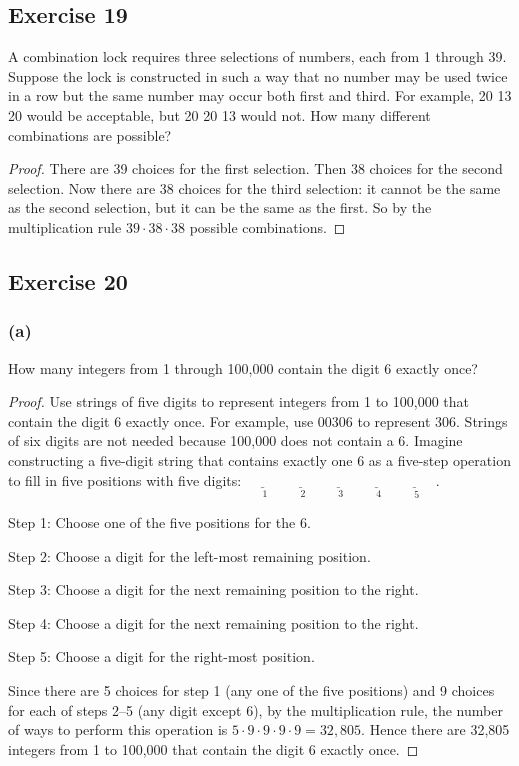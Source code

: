 \documentclass[14pt]{extarticle}
\newcommand{\fbl}{\underline{\hspace{1cm}}\,\,}
\newcommand{\cy}{\color{cyan}}
\begin{document}
\subsection{Exercise 19}
A combination lock requires three selections of numbers, each from 1 through 39. Suppose the lock is constructed in 
such a way that no number may be used twice in a row but the same number may occur both first and third. For 
example, 20 13 20 would be acceptable, but 20 20 13 would not. How many different combinations are possible?

\begin{proof}
There are 39 choices for the first selection. Then 38 choices for the second selection. Now there are 38 choices
for the third selection: it cannot be the same as the second selection, but it can be the same as the first. So 
by the multiplication rule \(39 \cdot 38 \cdot 38\) possible combinations.
\end{proof}

\subsection{Exercise 20}
\subsubsection{(a)}
How many integers from 1 through 100,000 contain the digit 6 exactly once?

\begin{proof}
Use strings of five digits to represent integers from 1 to 100,000 that contain the digit 6 exactly once. For example, 
use 00306 to represent 306. Strings of six digits are not needed because 100,000 does not contain a 6. Imagine 
constructing a five-digit string that contains exactly one 6 as a five-step operation to fill in five positions with 
five digits: \(\underset{1}{\fbl} \underset{2}{\fbl} \underset{3}{\fbl} \underset{4}{\fbl} \underset{5}{\fbl}\).

{\cy Step 1:} Choose one of the five positions for the 6.

{\cy Step 2:} Choose a digit for the left-most remaining position.

{\cy Step 3:} Choose a digit for the next remaining position to the right.

{\cy Step 4:} Choose a digit for the next remaining position to the right.

{\cy Step 5:} Choose a digit for the right-most position.

Since there are 5 choices for step 1 (any one of the five positions) and 9 choices for each of steps 2–5 (any digit 
except 6), by the multiplication rule, the number of ways to perform this operation is \(5 \cdot 9 \cdot 9 \cdot 9 
\cdot 9 = 32,805\). Hence there are 32,805 integers from 1 to 100,000 that contain the digit 6 exactly once.
\end{proof}
\end{document}
